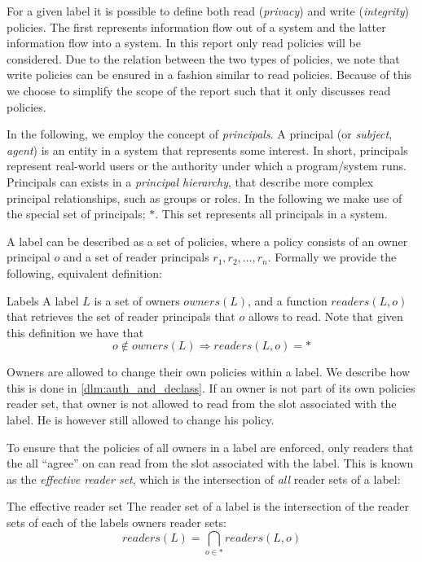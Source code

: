 For a given label it is possible to define both read (\emph{privacy}) and write (\emph{integrity}) policies.
The first represents information flow out of a system and the latter information flow into a system.
In this report only read policies will be considered.
Due to the relation between the two types of policies, we note that write policies can be ensured in a fashion similar to read policies.
Because of this we choose to simplify the scope of the report such that it only discusses read policies.

In the following, we employ the concept of \emph{principals}.
A principal (or \emph{subject}, \emph{agent}) is an entity in a system that represents some interest.
In short, principals represent real-world users or the authority under which a program/system runs.
Principals can exists in a \emph{principal hierarchy}, that describe more complex principal relationships, such as groups or roles.
In the following we make use of the special set of principals; $*$.
This set represents all principals in a system.

A label can be described as a set of policies, where a policy consists of an owner principal $o$ and a set of reader principals $r_1, r_2, \dots, r_n$.
Formally we provide the following, equivalent definition:
\begin{definition}{Labels}
A label $L$ is a set of owners $owners(L)$, and a function $readers(L, o)$ that retrieves the set of reader principals that $o$ allows to read.
Note that given this definition we have that $$o \notin owners(L) \Rightarrow readers(L, o) = *$$
\end{definition}

Owners are allowed to change their own policies within a label.
We describe how this is done in \cref{dlm:auth_and_declass}.
If an owner is not part of its own policies reader set, that owner is not allowed to read from the slot associated with the label.
He is however still allowed to change his policy.

To ensure that the policies of all owners in a label are enforced, only readers that the all ``agree'' on can read from the slot associated with the label.
This is known as the \emph{effective reader set}, which is the intersection of \emph{all} reader sets of a label:
\begin{definition}{The effective reader set}
  The reader set of a label is the intersection of the reader sets of each of the labels owners reader sets:
  $$readers(L) = \bigcap_{o \in *} readers(L, o)$$
\end{definition}

